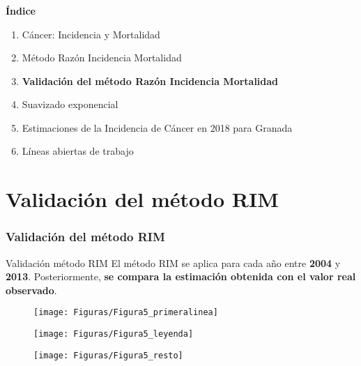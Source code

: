 \documentclass{beamer}
\begin{document}


\begin{frame}\frametitle{}

\Large{\textbf{Índice}}\\[2ex]
\normalsize
\begin{enumerate}
	\item Cáncer: Incidencia y Mortalidad \\[2ex]
	\item Método Razón Incidencia Mortalidad \\[2ex]
	\item \textbf{Validación del método Razón Incidencia Mortalidad} \\[2ex]
	\item Suavizado exponencial \\[2ex]
	\item  Estimaciones de la Incidencia de Cáncer en 2018 para Granada \\[2ex]
	\item Líneas abiertas de trabajo
\end{enumerate}

\end{frame}

\section{Validación del método RIM}
\begin{frame}\frametitle{Validación del método RIM}

\vspace{-30pt}
\begin{block}{Validación método RIM}
	El método RIM se aplica para cada año entre \textbf{2004} y \textbf{2013}. Posteriormente, \textbf{se compara la estimación obtenida con el valor real observado}.\\
\end{block}

\begin{figure}
	\centering
	\texttt{[image: Figuras/Figura5\_primeralinea]}
\end{figure}

\vspace{30pt}
\begin{figure}
	\centering
	\texttt{[image: Figuras/Figura5\_leyenda]}
\end{figure}

\pause

\vspace{-133pt}
\begin{figure}
	\centering
	\texttt{[image: Figuras/Figura5\_resto]}
\end{figure}

\end{frame}
\end{document}
